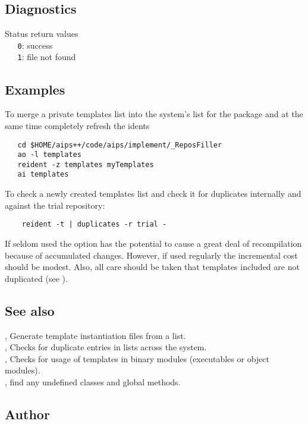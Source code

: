 \subsection*{Diagnostics}

Status return values
\\ \verb+   0+: success
\\ \verb+   1+: file not found

\subsection*{Examples}

To merge a private templates list into the system's list for the 
package and at the same time completely refresh the idents

\begin{verbatim}
   cd $HOME/aips++/code/aips/implement/_ReposFiller
   ao -l templates
   reident -z templates myTemplates
   ai templates
\end{verbatim}

To check a newly created templates list and check it for duplicates
internally and against the trial repository:

\begin{verbatim}
    reident -t | duplicates -r trial -
\end{verbatim}



\noindent
If seldom used the  option has the potential to cause a great deal of
recompilation because of accumulated changes.  However, if used regularly the
incremental cost should be modest. Also, all care should be taken that
templates included are not duplicated (see ).

\subsection*{See also}

, Generate template instantiation files from a list.\\
, Checks for duplicate entries in  lists
   across the system.\\
, Checks for usage of templates in binary modules (executables
or object modules).\\
, find any undefined classes and global methods.

\subsection*{Author}

